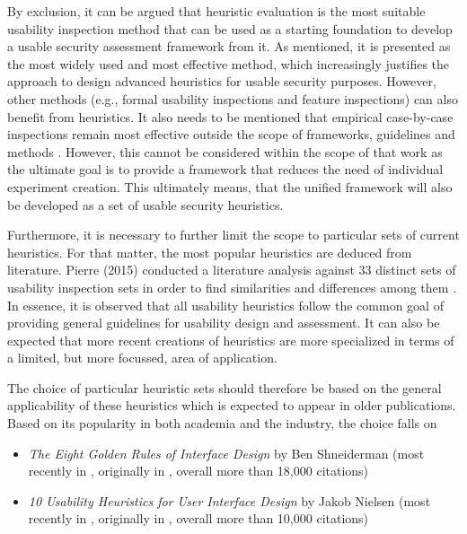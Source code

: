 By exclusion, it can be argued that heuristic evaluation is the most suitable usability inspection method that can be used as a starting foundation to develop a usable security assessment framework from it. As mentioned, it is presented as the most widely used and most effective method, which increasingly justifies the approach to design advanced heuristics for usable security purposes. However, other methods (e.g., formal usability inspections and feature inspections) can also benefit from heuristics. It also needs to be mentioned that empirical case-by-case inspections remain most effective outside the scope of frameworks, guidelines and methods \cite{hollingsed_usability_2007}. However, this cannot be considered within the scope of that work as the ultimate goal is to provide a framework that reduces the need of individual experiment creation. This ultimately means, that the unified framework will also be developed as a set of usable security heuristics.

Furthermore, it is necessary to further limit the scope to particular sets of current heuristics. For that matter, the most popular heuristics are deduced from literature. Pierre (2015) conducted a literature analysis against 33 distinct sets of usability inspection sets in order to find similarities and differences among them \cite{pierre_heuristics_2015}. In essence, it is observed that all usability heuristics follow the common goal of providing general guidelines for usability design and assessment. It can also be expected that more recent creations of heuristics are more specialized in terms of a limited, but more focussed, area of application.

The choice of particular heuristic sets should therefore be based on the general applicability of these heuristics which is expected to appear in older publications. Based on its popularity in both academia and the industry, the choice falls on

\begin{itemize}
	\item \textit{The Eight Golden Rules of Interface Design} by Ben Shneiderman (most recently in \cite{shneiderman_eight_nodate}, originally in \cite{shneiderman_designing_1987}, overall more than 18,000 citations)
	\item \textit{10 Usability Heuristics for User Interface Design} by Jakob Nielsen (most recently in \cite{nielsen_10_2020}, originally in \cite{nielsen_heuristic_1990}, overall more than 10,000 citations)
\end{itemize}

